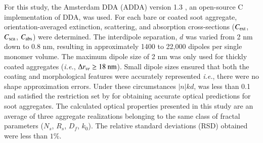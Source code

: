 For this study, the Amsterdam DDA (ADDA) version 1.3 \citep{RN11}, an open-source C implementation of DDA, was used. For each bare or coated soot aggregate, orientation-averaged extinction, scattering, and absorption cross-sections ($C_{\rm ext}$, $C_{\rm sca}$, $C_{\rm abs}$) were determined. The interdipole separation, $d$ was varied from 2 nm down to 0.8 nm, resulting in approximately 1400 to 22,000 dipoles per single monomer volume. The maximum dipole size of 2 nm was only used for thickly coated aggregates (\textit{i.e.}, $\Delta r_{ve}\ge 18\ \rm nm$). Small dipole sizes ensured that both the coating and morphological features were accurately represented \textit{i.e.}, there were no shape approximation errors. Under these circumstances $|n|kd$, was less than 0.1 and satisfied the restriction set by \citet{RN32} for obtaining accurate optical predictions for soot aggregates. The calculated optical properties presented in this study are an average of three aggregate realizations belonging to the same class of fractal parameters ($N_s$, $R_s$, $D_f$, $k_0$). The relative standard deviations (RSD) obtained were less than $1\%$.
